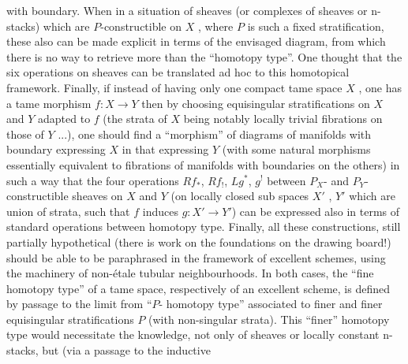
with boundary.  When in a situation of sheaves (or complexes
of sheaves or n-stacks) which are $P$-constructible on $X$ , where
$P$ is such a fixed stratification, these also can be made
explicit in terms of the envisaged diagram, from which there is
no way to retrieve more than the ``homotopy type''. One thought
that the six operations on sheaves can be translated ad hoc to
this homotopical framework. Finally, if instead of having only
one compact tame space $X$ , one has a tame morphism $f : X \to Y$
then by choosing equisingular stratifications on $X$ and $Y$
adapted to $f$ (the strata of $X$ being notably locally trivial
fibrations on those of $Y$ ...), one should find a ``morphism''
of diagrams of manifolds with boundary expressing $X$ in that
expressing $Y$ (with some natural morphisms essentially equivalent
to fibrations of manifolds with boundaries on the others) in
such a way that the four operations $Rf_*$, $Rf_!$, $Lg^*$, $g^!$ between
$P_X$- and $P_Y$- constructible sheaves on $X$ and $Y$ (on locally
closed sub spaces $X'$ , $Y'$ which are union of strata, such that
$f$ induces $g : X' \to Y'$) can be expressed also in terms of
standard operations between homotopy type. Finally, all these
constructions, still partially hypothetical (there is work on
the foundations on the drawing board!) should be able to be
paraphrased in the framework of excellent schemes, using the
machinery of non-étale tubular neighbourhoods. In both cases,
the ``fine homotopy type'' of a tame space, respectively of an
excellent scheme, is defined by passage to the limit from ``$P$-
homotopy type'' associated to finer and finer equisingular
stratifications $P$ (with non-singular strata). This ``finer''
homotopy type would necessitate the knowledge, not only of sheaves
or locally constant n-stacks, but (via a passage to the inductive


